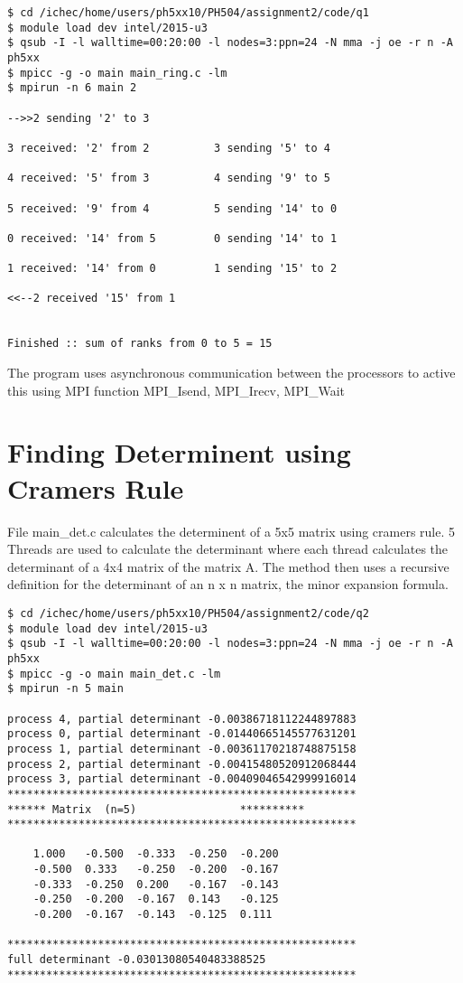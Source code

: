 \documentclass[a4paper]{article}
\begin{document}
\begin{verbatim}
$ cd /ichec/home/users/ph5xx10/PH504/assignment2/code/q1
$ module load dev intel/2015-u3
$ qsub -I -l walltime=00:20:00 -l nodes=3:ppn=24 -N mma -j oe -r n -A ph5xx
$ mpicc -g -o main main_ring.c -lm
$ mpirun -n 6 main 2

-->>2 sending '2' to 3

3 received: '2' from 2			3 sending '5' to 4

4 received: '5' from 3			4 sending '9' to 5

5 received: '9' from 4			5 sending '14' to 0

0 received: '14' from 5			0 sending '14' to 1

1 received: '14' from 0			1 sending '15' to 2

<<--2 received '15' from 1


Finished :: sum of ranks from 0 to 5 = 15

\end{verbatim}

The program uses asynchronous communication between the processors to active this using MPI function MPI\_Isend, MPI\_Irecv, MPI\_Wait



\newpage
\section{Finding Determinent using Cramers Rule}
File main\_det.c calculates the determinent of a 5x5 matrix using cramers rule. 5 Threads are used to calculate the determinant where each thread calculates the determinant 
of a 4x4 matrix of the matrix A. The method then uses  a recursive definition for the determinant of an n x n matrix, the minor expansion formula.

\begin{verbatim}
$ cd /ichec/home/users/ph5xx10/PH504/assignment2/code/q2
$ module load dev intel/2015-u3
$ qsub -I -l walltime=00:20:00 -l nodes=3:ppn=24 -N mma -j oe -r n -A ph5xx
$ mpicc -g -o main main_det.c -lm
$ mpirun -n 5 main

process 4, partial determinant -0.00386718112244897883
process 0, partial determinant -0.01440665145577631201
process 1, partial determinant -0.00361170218748875158
process 2, partial determinant -0.00415480520912068444
process 3, partial determinant -0.00409046542999916014
****************************************************** 
****** Matrix  (n=5)                ********** 
****************************************************** 

	1.000	-0.500	-0.333	-0.250	-0.200	
	-0.500	0.333	-0.250	-0.200	-0.167	
	-0.333	-0.250	0.200	-0.167	-0.143	
	-0.250	-0.200	-0.167	0.143	-0.125	
	-0.200	-0.167	-0.143	-0.125	0.111	

****************************************************** 
full determinant -0.03013080540483388525
******************************************************

\end{verbatim}
\end{document}
